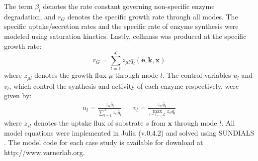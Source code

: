 \documentclass[10pt,twocolumn,twoside,final]{IEEEtran}
\begin{document}
The term $\beta_{l}$ denotes the rate constant governing non-specific enzyme degradation, and $r_{G}$ denotes the specific growth rate through all modes.
The specific uptake/secretion rates and the specific rate of enzyme synthesis were modeled using saturation kinetics.
Lastly, cellmass was produced at the specific growth rate:
\begin{equation}
	r_{G}  = \sum_{l = 1}^{\mathcal{L}}z_{\mu l}q_{l}\left(\mathbf{e},\mathbf{k},\mathbf{x}\right)
\end{equation}
where $z_{\mu l}$ denotes the growth flux $\mu$ through mode $l$.
The control variables $u_{l}$ and $v_{l}$, which control the synthesis and activity of each enzyme respectively, were given by:
\begin{align*}
	u_{l}  = \frac{z_{sl}\bar{q}_{l}}{\sum\limits_{l = 1}^{\mathcal{L}}z_{sl}\bar{q}_{l}} && v_{l} = \frac{z_{sl}\bar{q}_{l}}{\max\limits_{l=1,\hdots,\mathcal{L}}z_{sl}\bar{q}_{l}}
\end{align*}
where $z_{sl}$ denotes the uptake flux of substrate $s$ from $\mathbf{x}$ through mode $l$.
All model equations were implemented in Julia (v.0.4.2) \cite{Julia} and solved using SUNDIALS \cite{Sundials}. 
The model code for each case study is available for download at http://www.varnerlab.org.


\end{document}
